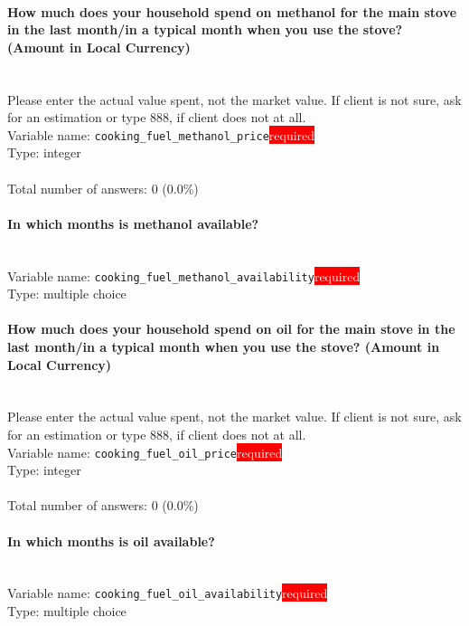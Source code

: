 \documentclass[11.5pt, a4paper]{scrartcl}
\begin{document}
\paragraph{How much does your household spend on methanol for the main stove in the last month/in a typical month when you use the stove? (Amount in Local Currency) }
\ \\ {\small Please enter the actual value spent, not the market value. If client is not sure, ask for an estimation or type 888, if client does not at all. }
\  \\Variable name: \texttt{cooking\_fuel\_methanol\_price}\hfill\colorbox{red}{\small{\textcolor{white}{required}}}\\
 Type: integer\\
\\Total number of answers: 0 (0.0\%)
\\[0.2em]\paragraph{In which months is methanol available?}
\  \\Variable name: \texttt{cooking\_fuel\_methanol\_availability}\hfill\colorbox{red}{\small{\textcolor{white}{required}}}\\
 Type: multiple choice\\
\paragraph{How much  does your household spend on oil for the main stove in the last month/in a typical month when you use the stove? (Amount in Local Currency) }
\ \\ {\small Please enter the actual value spent, not the market value. If client is not sure, ask for an estimation or type 888, if client does not at all. }
\  \\Variable name: \texttt{cooking\_fuel\_oil\_price}\hfill\colorbox{red}{\small{\textcolor{white}{required}}}\\
 Type: integer\\
\\Total number of answers: 0 (0.0\%)
\\[0.2em]\paragraph{In which months is oil available?}
\  \\Variable name: \texttt{cooking\_fuel\_oil\_availability}\hfill\colorbox{red}{\small{\textcolor{white}{required}}}\\
 Type: multiple choice\\
\end{document}

